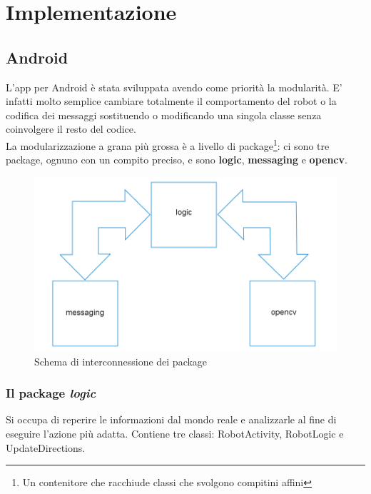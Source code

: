 \chapter{Implementazione}
\fancyfoot[C]{\thepage }
\section {Android}
L'app per Android è stata sviluppata avendo come priorità la modularità. E' 
infatti molto semplice cambiare totalmente il comportamento del robot o la 
codifica dei messaggi sostituendo o modificando una singola classe senza 
coinvolgere il resto del codice.\\
La modularizzazione a grana più grossa è a livello di package\footnote{Un contenitore 
che racchiude classi che svolgono compitini affini}: ci sono tre package,
ognuno con un compito preciso, e sono \textbf{logic}, \textbf{messaging} e \textbf{opencv}.
\begin{figure}[H] \center
\includegraphics[scale=0.2]{immagini/package_diagram.png}
\caption{Schema di interconnessione dei package} 
\end{figure}
\subsection {Il package \textit{logic}}
Si occupa di reperire le informazioni dal mondo reale e analizzarle al fine di
eseguire l'azione più adatta.
Contiene tre classi: RobotActivity, RobotLogic e UpdateDirections.
